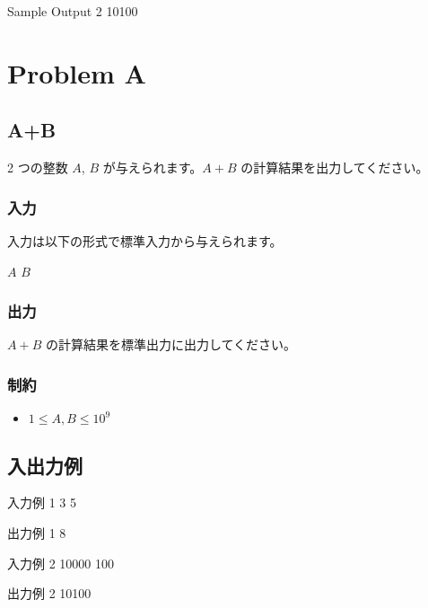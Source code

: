 \documentclass[11pt,a4paper]{article}
\begin{document}
\begin{itembox}[l]{ Sample Output 2 }
10100

\end{itembox}






\section{Problem A}

\subsection{A+B}

2 つの整数 $A$, $B$ が与えられます。$A + B$ の計算結果を出力してください。

\subsubsection{入力}

入力は以下の形式で標準入力から与えられます。

\begin{screen}
$A$ $B$
\end{screen}

\subsubsection{出力}

$A + B$ の計算結果を標準出力に出力してください。

\subsubsection{制約}

\begin{itemize}
    \item $1 \leq A, B \leq 10^{9}$
\end{itemize}



\subsection{ 入出力例 }



\begin{itembox}[l]{ 入力例 1 }
3 5

\end{itembox}



\begin{itembox}[l]{ 出力例 1 }
8

\end{itembox}







\begin{itembox}[l]{ 入力例 2 }
10000 100

\end{itembox}



\begin{itembox}[l]{ 出力例 2 }
10100

\end{itembox}
\end{document}
